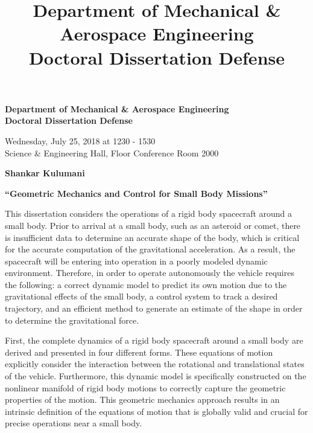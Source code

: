 \documentclass[letterpaper]{article}
\title{Department of Mechanical \& Aerospace Engineering\\
Doctoral Dissertation Defense}
\date{}
\begin{document}
\begin{center}
    \textbf{\large
    Department of Mechanical \& Aerospace Engineering\\
    Doctoral Dissertation Defense
}
\end{center}

\begin{center}
    Wednesday, July 25, 2018 at 1230 - 1530\\
    Science \& Engineering Hall,  Floor Conference Room 2000
\end{center}

\begin{center}
    \textbf{Shankar Kulumani}
\end{center}

\begin{center}
    \textbf{``Geometric Mechanics and Control for Small Body Missions''}
\end{center}

This dissertation considers the operations of a rigid body spacecraft around a small body.
Prior to arrival at a small body, such as an asteroid or comet, there is insufficient data to determine an accurate shape of the body, which is critical for the accurate computation of the gravitational acceleration. 
As a result, the spacecraft will be entering into operation in a poorly modeled dynamic environment.
Therefore, in order to operate autonomously the vehicle requires the following: a correct dynamic model to predict its own motion due to the gravitational effects of the small body, a control system to track a desired trajectory, and an efficient method to generate an estimate of the shape in order to determine the gravitational force.

First, the complete dynamics of a rigid body spacecraft around a small body are derived and presented in four different forms.
These equations of motion explicitly consider the interaction between the rotational and translational states of the vehicle.
Furthermore, this dynamic model is specifically constructed on the nonlinear manifold of rigid body motions to correctly capture the geometric properties of the motion. 
This geometric mechanics approach results in an intrinsic definition of the equations of motion that is globally valid and crucial for precise operations near a small body.
\end{document}
